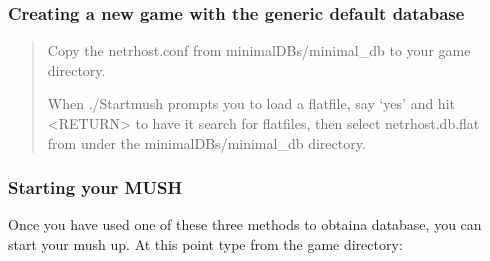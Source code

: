 \documentclass[letterpaper,10pt,english]{sphinxmanual}
\begin{document}
\subsubsection{Creating a new game with the generic default database}
\label{\detokenize{installation:creating-a-new-game-with-the-generic-default-database}}\begin{quote}

\sphinxAtStartPar
Copy the netrhost.conf from minimal\sphinxhyphen{}DBs/minimal\_db to your game directory.

\sphinxAtStartPar
When ./Startmush prompts you to load a flatfile, say ‘yes’ and hit \textless{}RETURN\textgreater{}
to have it search for flatfiles, then select netrhost.db.flat from under
the minimal\sphinxhyphen{}DBs/minimal\_db directory.
\end{quote}


\subsubsection{Starting your MUSH}
\label{\detokenize{installation:starting-your-mush}}
\sphinxAtStartPar
Once you have used one of these three methods to obtaina database, you can start your mush up.
At this point type from the game directory:

\begin{sphinxVerbatim}[commandchars=\\\{\}]
\end{sphinxVerbatim}
\end{document}
